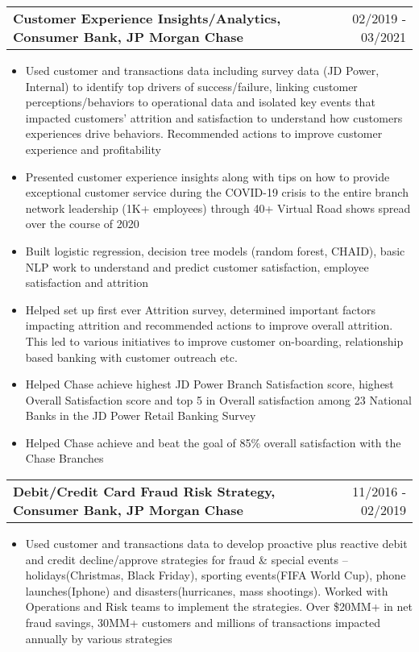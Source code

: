 \documentclass[a4paper,20pt]{article}
\makeatletter
\newcommand{\resumeSubheading}[2]{
  \vspace{1pt}\item
    \begin{tabular*}{0.97\textwidth}{l@{\extracolsep{\fill}}r}
      \textbf{#1} & #2 \\
    \end{tabular*}\vspace{1pt}
}
\makeatother
\begin{document}
\vspace{1pt}
     \resumeSubheading{Customer Experience Insights/Analytics, Consumer Bank, JP Morgan Chase}{02/2019 - 03/2021}
\begin{itemize}
\item {Used customer and transactions data including survey data (JD Power, Internal) to identify top drivers of success/failure, linking customer perceptions/behaviors to operational data and isolated key events that impacted customers’ attrition and satisfaction to understand how customers experiences drive behaviors. Recommended actions to improve customer experience and profitability}
\vspace{1pt}
\item {Presented customer experience insights along with tips on how to provide exceptional customer service during the COVID-19 crisis to the entire branch network leadership (1K+ employees) through 40+ Virtual Road shows spread over the course of 2020}
\vspace{1pt}
\item {Built logistic regression, decision tree models (random forest, CHAID), basic NLP work to understand and predict customer satisfaction, employee satisfaction and attrition}
\vspace{1pt}
\item {Helped set up first ever Attrition survey, determined important factors impacting attrition and recommended actions to improve overall attrition. This led to various initiatives to improve customer on-boarding, relationship based banking with customer outreach etc.}
\vspace{1pt}
\item {Helped Chase achieve highest JD Power Branch Satisfaction score, highest Overall Satisfaction score and top 5 in Overall satisfaction among 23 National Banks in the JD Power Retail Banking Survey}
\vspace{1pt}
\item {Helped Chase achieve and beat the goal of 85\% overall satisfaction with the Chase Branches}
\end{itemize}


\vspace{1pt}
     \resumeSubheading{Debit/Credit Card Fraud Risk Strategy, Consumer Bank, JP Morgan Chase}{11/2016 - 02/2019}
\begin{itemize}
\item {Used customer and transactions data to develop proactive plus reactive debit and credit decline/approve strategies for fraud \& special events – holidays(Christmas, Black Friday), sporting events(FIFA World Cup), phone launches(Iphone) and disasters(hurricanes, mass shootings). Worked with Operations and Risk teams to implement the strategies. Over \$20MM+ in net fraud savings, 30MM+ customers and millions of transactions impacted annually by various strategies}
\end{itemize}
\end{document}
